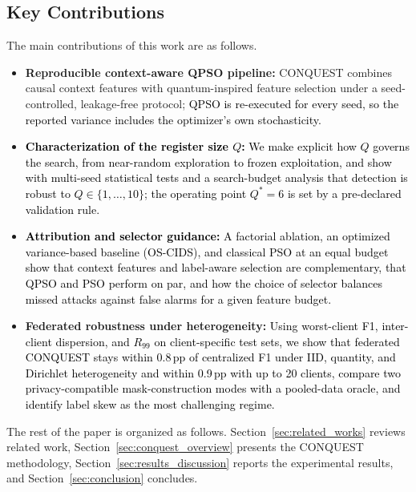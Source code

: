 \documentclass[conference]{IEEEtran}
\begin{document}
\subsection{Key Contributions}
The main contributions of this work are as follows.
\begin{itemize}
    \item \textbf{Reproducible context-aware QPSO pipeline:} CONQUEST
    combines causal context features with quantum-inspired feature
    selection under a seed-controlled, leakage-free protocol;
    \textcolor{black}{QPSO is re-executed for every seed, so the reported
    variance includes the optimizer's own stochasticity.}

    \item \textbf{\textcolor{black}{Characterization of the
    register size $Q$:}} \textcolor{black}{We make explicit how $Q$ governs
    the search, from near-random exploration to frozen exploitation,
    and show with multi-seed statistical tests and a search-budget
    analysis that detection is robust to $Q\in\{1,\dots,10\}$; the
    operating point $Q^{*}=6$ is set by a pre-declared validation rule.}

    \item \textbf{\textcolor{black}{Attribution and selector guidance:}}
    \textcolor{black}{A factorial ablation, an optimized variance-based
    baseline (OS-CIDS), and classical PSO at an equal budget show that
    context features and label-aware selection are complementary, that
    QPSO and PSO perform on par, and how the choice of selector balances
    missed attacks against false alarms for a given feature budget.}

    \item \textbf{Federated robustness under heterogeneity:}
    \textcolor{black}{Using worst-client F1,
    inter-client dispersion, and $R_{99}$ on client-specific test sets,
    we show that federated CONQUEST stays within 0.8\,pp of centralized
    F1 under IID, quantity, and Dirichlet heterogeneity and within
    0.9\,pp with up to 20 clients, compare two privacy-compatible
    mask-construction modes with a pooled-data oracle, and identify
    label skew as the most
    challenging regime.}
\end{itemize}

The rest of the paper is organized as follows.
Section~\ref{sec:related_works} reviews related work,
Section~\ref{sec:conquest_overview} presents the CONQUEST methodology,
Section~\ref{sec:results_discussion} reports the experimental results,
and Section~\ref{sec:conclusion} concludes.
\end{document}
